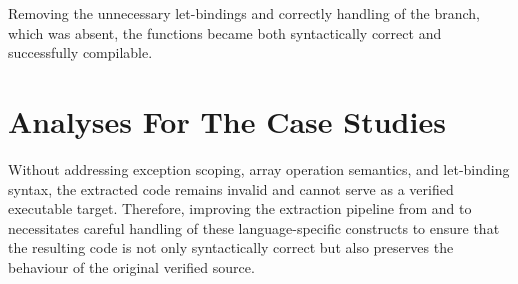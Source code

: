 Removing the unnecessary let-bindings and correctly handling of the  branch, which was absent, the functions became 
both syntactically correct and successfully compilable.

\section{Analyses For The Case Studies}

Without addressing exception scoping, array operation semantics, and let-binding syntax, the extracted code remains invalid 
and cannot serve as a verified executable target. Therefore, improving the extraction pipeline from \ocaml and \gospel to 
\cml necessitates careful handling of these language-specific constructs to ensure that the resulting code is not only 
syntactically correct but also preserves the behaviour of the original verified source.
